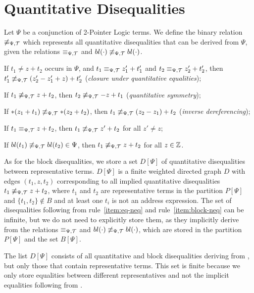 \section{Quantitative Disequalities}\label{section:disequalities}

Let $\Psi$ be a conjunction of 2-Pointer Logic terms.
We define the binary relation $\not\equiv_{\Psi,\mathcal{T}}$ which represents all quantitative disequalities that can be derived from $\Psi$, given the relations $\equiv_{\Psi,\mathcal{T}}$ and $bl(\cdot)\not\equiv_{\Psi,\mathcal{T}} bl(\cdot)$.\cite{c2po}

\begin{enumerate}[label={[D\arabic*]}, ref={[D\arabic*]}]
    \setcounter{enumi}{-1} %
    \item\label{item:neq-quantitative-equalities}
    If $t_1 \neq z + t_2$ occurs in $\Psi$, and $t_1 \equiv_{\Psi,\mathcal{T}} z'_1 + t'_1$ and $t_2\equiv_{\Psi,\mathcal{T}} z'_2+t'_2$,
    then $t'_1\not\equiv_{\Psi,\mathcal{T}} (z'_2-z'_1+z)+t'_2$ (\emph{closure under quantitative equalities});
    \item\label{item:neq-quantitative-symmetry} If $t_1 \not\equiv_{\Psi,\mathcal{T}} z + t_2$, then $t_2 \not\equiv_{\Psi,\mathcal{T}} -z + t_1$ (\emph{quantitative symmetry});
    \item\label{item:inverse-deref}
    If $*(z_1 + t_1) \not\equiv_{\Psi,\mathcal{T}} *(z_2 + t_2)$, then $t_1 \not\equiv_{\Psi,\mathcal{T}} (z_2 - z_1) + t_2$
    (\emph{inverse dereferencing});
    \item\label{item:eq-neq} If $t_1 \equiv_{\Psi,\mathcal{T}} z + t_2$, then $t_1\not\equiv_{\Psi,\mathcal{T}} z'+t_2$ for all $z'\neq z$;
    \item\label{item:block-neq} If $bl(t_1) \not\equiv_{\Psi,\mathcal{T}} bl(t_2) \in \Psi$, then $t_1 \not\equiv_{\Psi,\mathcal{T}} z + t_2$ for all $z \in \mathbb{Z}$.
\end{enumerate}

As for the block disequalities, we store a set $D[\Psi]$ of quantitative disequalities between representative terms.
$D[\Psi]$ is a finite weighted directed graph $D$ with edges $(t_1,z,t_2)$ corresponding to all implied
quantitative disequalities $t_1 \not\equiv_{\Psi,\mathcal{T}} z+t_2$, where $t_1$ and $t_2$ are representative terms in the partition $P[\Psi]$ and
$\{t_1,t_2\}\not\in B$ and at least one
$t_i$ is not an address expression.
The set of disequalities following from rule~\ref{item:eq-neq} and rule~\ref{item:block-neq} can be infinite, but we do not need to explicitly store them, as they implicitly derive from the relations $\equiv_{\Psi,\mathcal{T}}$ and $bl(\cdot)\not\equiv_{\Psi,\mathcal{T}} bl(\cdot)$, which are stored in the partition $P[\Psi]$ and the set $B[\Psi]$.

The list $D[\Psi]$ consists of all quantitative and block disequalities deriving from
,
but only those that contain representative terms.
This set is finite because we only store equalities between different representatives and not the implicit equalities following from .

